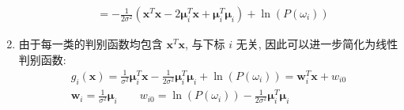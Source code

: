 \documentclass[homework]{IEEEtran}
\begin{document}
\begin{CJK}{UTF8}{gkai}
\begin{enumerate}[线性判别函数:]
$$\begin{aligned}
            &=-\frac{1}{2 \sigma^2}\left(\mathbf{x}^T \mathbf{x}-2 \boldsymbol{\mu}_i^T \mathbf{x}+\boldsymbol{\mu}_i^T \boldsymbol{\mu}_i\right)+\ln \left(P\left(\omega_i\right)\right)
          \end{aligned}$$
        \item 由于每一类的判别函数均包含 $\mathbf{x}^T \mathbf{x}$, 与下标 $i$ 无关, 因此可以进一步简化为线性判别函数:
        $$
        \begin{aligned}
         g_i(\mathbf{x}) =\frac{1}{\sigma^2} \boldsymbol{\mu}_i^T \mathbf{x}-\frac{1}{2 \sigma^2} \boldsymbol{\mu}_i^T \boldsymbol{\mu}_i+\ln \left(P\left(\omega_i\right)\right) =\mathbf{w}_i^T \mathbf{x}+w_{i 0} \\
            \mathbf{w}_i=\frac{1}{\sigma^2} \boldsymbol{\mu}_i \qquad w_{i 0}=\ln \left(P\left(\omega_i\right)\right)-\frac{1}{2 \sigma^2} \boldsymbol{\mu}_i^T \boldsymbol{\mu}_i
        \end{aligned}$$
    \end{enumerate}
\end{CJK}
\end{document}
